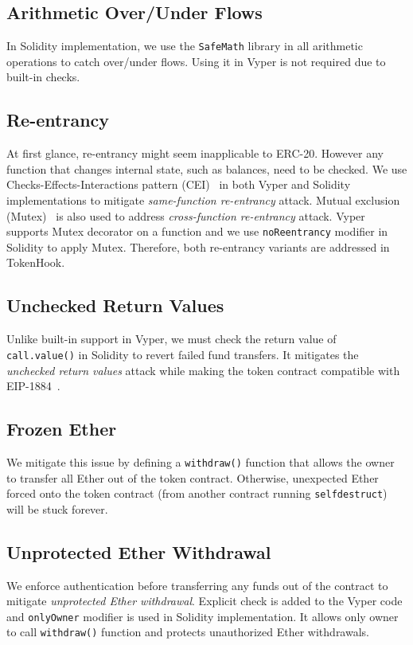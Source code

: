 \subsection*{Arithmetic Over/Under Flows} In Solidity implementation, we use the \texttt{SafeMath} library in all arithmetic operations to catch over/under flows. Using it in Vyper is not required due to built-in checks.

\subsection*{Re-entrancy} At first glance, re-entrancy might seem inapplicable to ERC-20. However any function that changes internal state, such as balances, need to be checked. We use Checks-Effects-Interactions pattern (CEI)~\cite{CEI} in both Vyper and Solidity implementations to mitigate \textit{same-function re-entrancy} attack. Mutual exclusion (Mutex)~\cite{WiKiMutex} is also used to address \textit{cross-function re-entrancy} attack. Vyper supports Mutex decorator on a function and we use \texttt{noReentrancy} modifier in Solidity to apply Mutex. Therefore, both re-entrancy variants are addressed in TokenHook. 

\subsection*{Unchecked Return Values} Unlike built-in support in Vyper, we must check the return value of \texttt{call.value()} in Solidity to revert failed fund transfers. It mitigates the \textit{unchecked return values} attack while making the token contract compatible with EIP-1884~\cite{EIP1884}. 

\subsection*{Frozen Ether} We mitigate this issue by defining a \texttt{withdraw()} function that allows the owner to transfer all Ether out of the token contract. Otherwise, unexpected Ether forced onto the token contract (\eg from another contract running \texttt{selfdestruct}) will be stuck forever. 

\subsection*{Unprotected Ether Withdrawal} We enforce authentication before transferring any funds out of the contract to mitigate \textit{unprotected Ether withdrawal}. Explicit check is added to the Vyper code and \texttt{onlyOwner} modifier is used in Solidity implementation. It allows only owner to call \texttt{withdraw()} function and protects unauthorized Ether withdrawals. 

